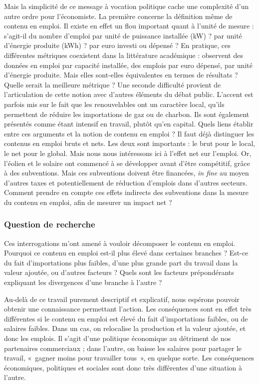 Mais la simplicité de ce message à vocation politique cache une complexité d’un autre ordre pour l’économiste. 
La première concerne la définition même de contenu en emploi. Il existe en effet un flou important quant à l’unité de mesure : s’agit-il du nombre d’emploi par unité de puissance installée (kW) ? par unité d’énergie produite (kWh) ? par euro investi ou dépensé ? En pratique, ces différentes métriques coexistent dans la littérature académique : \citet{Cameron2015} observent des données en emploi par capacité installée, \citet{Quirion2013} des emplois par euro dépensé, \citet{Wei2010} par unité d’énergie produite. Mais elles sont-elles équivalentes en termes de résultats ? Quelle serait la meilleure métrique ?
Une seconde difficulté provient de l’articulation de cette notion avec d’autres éléments du débat public. L’accent est parfois mis sur le fait que les renouvelables ont un caractère local, qu’ils permettent de réduire les importations de gaz ou de charbon. Ils sont également présentés comme étant intensif en travail, plutôt qu’en capital. Quels liens établir entre ces arguments et la notion de contenu en emploi ?
Il faut déjà distinguer les contenus en emploi bruts et nets. Les deux sont importants : le brut pour le local, le net pour le global. Mais nous nous intéressons ici à l’effet net sur l’emploi. Or, l'éolien et le solaire ont commencé à se développer avant d’être compétitif, grâce à des subventions. Mais ces subventions doivent être financées, \textit{in fine} au moyen d’autres taxes et potentiellement de réduction d’emplois dans d’autres secteurs. Comment prendre en compte ces effets indirects des subventions dans la mesure du contenu en emploi, afin de mesurer un impact net ?

\subsubsection{Question de recherche}
Ces interrogations m’ont amené à vouloir décomposer le contenu en emploi. Pourquoi ce contenu en emploi est-il plus élevé dans certaines branches ? Est-ce du fait d’importations plus faibles, d’une plus grande part du travail dans la valeur ajoutée, ou d’autres facteurs ?  Quels sont les facteurs prépondérants expliquant les divergences d’une branche à l’autre ?

Au-delà de ce travail purement descriptif et explicatif, nous espérons pouvoir obtenir une connaissance permettant l’action. Les conséquences sont en effet très différentes si le contenu en emploi est élevé du fait d’importations faibles, ou de salaires faibles. Dans un cas, on relocalise la production et la valeur ajoutée, et donc les emplois. Il s’agit d’une politique économique au détriment de nos partenaires commerciaux ; dans l’autre, on baisse les salaires pour partager le travail,  «~gagner moins pour travailler tous~», en quelque sorte. Les conséquences économiques, politiques et sociales sont donc très différentes d’une situation à l’autre.

